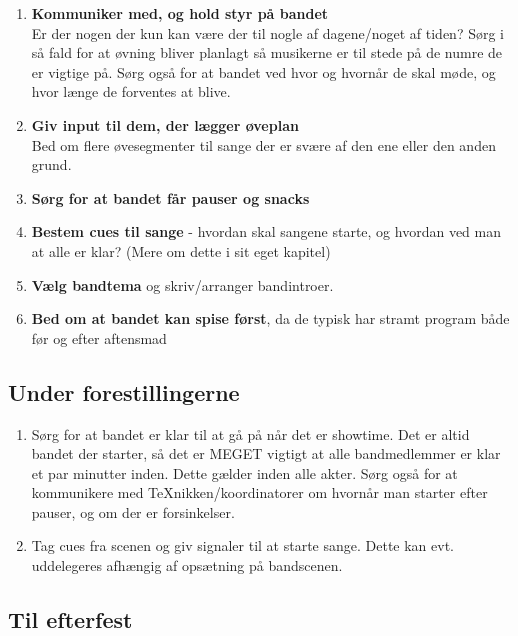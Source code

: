 \begin{enumerate}
\item \textbf{Kommuniker med, og hold styr på bandet}\\
Er der nogen der kun kan være der til nogle af dagene/noget af tiden? Sørg i så fald for at øvning bliver planlagt så musikerne er til stede på de numre de er vigtige på. Sørg også for at bandet ved hvor og hvornår de skal møde, og hvor længe de forventes at blive.

\item \textbf{Giv input til dem, der lægger øveplan}\\
Bed om flere øvesegmenter til sange der er svære af den ene eller den anden grund.

\item \textbf{Sørg for at bandet får pauser og snacks}

\item \textbf{Bestem cues til sange} - hvordan skal sangene starte, og hvordan ved man at alle er klar? (Mere om dette i sit eget kapitel)

\item \textbf{Vælg bandtema} og skriv/arranger bandintroer.

\item \textbf{Bed om at bandet kan spise først}, da de typisk har stramt program både før og efter aftensmad
\end{enumerate}

\subsection*{Under forestillingerne}

\begin{enumerate}
\item Sørg for at bandet er klar til at gå på når det er showtime.
Det er altid bandet der starter, så det er MEGET vigtigt at alle bandmedlemmer er klar et par minutter inden. Dette gælder inden alle akter. Sørg også for at kommunikere med TeXnikken/koordinatorer om hvornår man starter efter pauser, og om der er forsinkelser.

\item Tag cues fra scenen og giv signaler til at starte sange.
Dette kan evt. uddelegeres afhængig af opsætning på bandscenen.
\end{enumerate}

\subsection*{Til efterfest}

